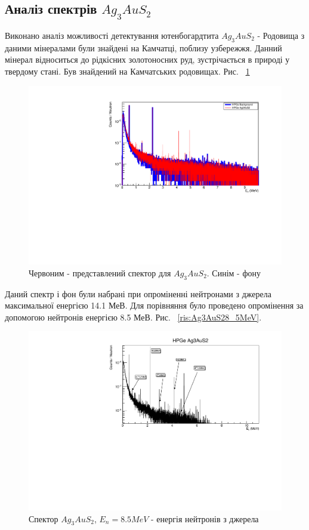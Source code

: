 \documentclass[a4paper, 14pt]{article}
\numberwithin{equation}{section}
\numberwithin{table}{section}
\begin{document}
\subsection{Аналіз спектрів $Ag_3AuS_2$}
Виконано аналіз можливості детектування ютенбогардтита $Ag_3AuS_2$ - Родовища з даними мінералами були знайдені на Камчатці, поблизу узбережжя. Данний мінерал відноситься до рідкісних золотоносних руд, зустрічається в природі у твердому стані. Був знайдений на Камчатських родовищах. Рис. ~\ref{ris:Ag3AuS2Fon}		
\begin{figure}[hbt!]
	\centering \includegraphics[width=1\textwidth]{res/auFonAllLog.pdf}
	\caption{Червоним - представлений спектор для $Ag_3AuS_2$. Синім - фону} 
	\label{ris:Ag3AuS2Fon}	
\end{figure} 	
Даний спектр і фон були набрані при опроміненні нейтронами з джерела максимальної енергією 14.1 МеВ.
Для порівняння було проведено опромінення за допомогою нейтронів енергією 8.5 МеВ. Рис. ~\ref{ris:Ag3AuS28_5MeV}.
\begin{figure}[hbt!]
	\centering \includegraphics[width=1\textwidth]{res/Au_AnzSpectr.pdf}
	\caption{Спектор $Ag_3AuS_2$, $E_{n} = 8.5 MeV$ - енергія нейтронів з джерела}
	\label{ris:Ag3AuS28_5MeVPick}	
\end{figure} 
\end{document}

